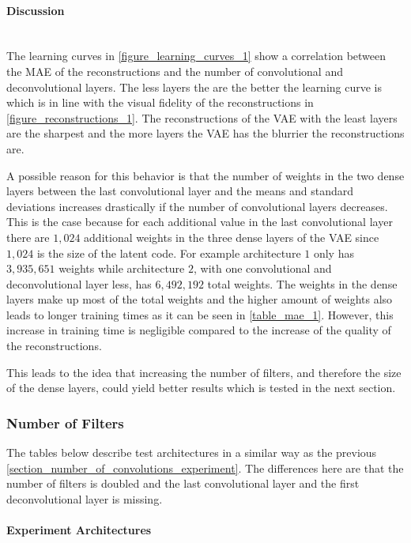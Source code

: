 \paragraph{Discussion} \mbox{} \\

The learning curves in \autoref{figure_learning_curves_1} show a correlation between the MAE of the
reconstructions and the number of convolutional and deconvolutional layers. The less layers the are the better
the learning curve is which is in line with the visual fidelity of the reconstructions in 
\autoref{figure_reconstructions_1}. The reconstructions of the VAE with the least layers are the sharpest and the 
more layers the VAE has the blurrier the reconstructions are. 

A possible reason for this behavior is that the number of weights in the two dense layers between the 
last convolutional layer and the means and standard deviations increases drastically
if the number of convolutional layers decreases. This is the case because for each additional
value in the last convolutional layer there are $1,024$ additional weights in the three dense layers of the VAE
since $1,024$ is the size of the latent code. For example architecture $1$ only has $3,935,651$ weights while
architecture $2$, with one convolutional and deconvolutional layer less, has $6,492,192$ total weights.
The weights in the dense layers make up most of the total weights
and the higher amount of weights also leads to longer training times as it can be seen in \autoref{table_mae_1}.
However, this increase in training time is negligible compared to the increase of the quality of the reconstructions. 

This leads to the idea that increasing the number of filters, and therefore the size of the dense layers, could yield
better results which is tested in the next section.

\pagebreak
\subsubsection{Number of Filters} \label{section_number_of_filters}

The tables below describe test architectures in a similar way as the previous 
\autoref{section_number_of_convolutions_experiment}. The differences here are that the number of filters is doubled and
the last convolutional layer and the first deconvolutional layer is missing.

\paragraph{Experiment Architectures}

